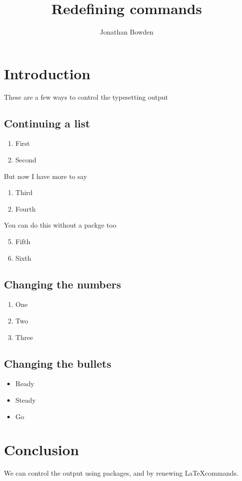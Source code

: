 \documentclass{article}
\title{Redefining commands}
\author{Jonathan Bowden}
\begin{document}
\maketitle

\section{Introduction}

These are a few ways to control the typesetting output

\subsection{Continuing a list}

\begin{enumerate}
\item First
\item Second

\end{enumerate}

\noindent But now I have more to say

\begin{enumerate}[resume]
\item Third
\item Fourth

\end{enumerate}

You can do this without a packge too

\begin{enumerate}
\setcounter{enumi}{4}
\item Fifth
\item Sixth
\end{enumerate}

\subsection{Changing the numbers}

\renewcommand{\theenumi}{\Alph{enumi}}
\begin{enumerate}
\item One
\item Two
\item Three
\end{enumerate}

\subsection{Changing the bullets}
\renewcommand{\labelitemi}{$\rightarrow$}
\begin{itemize}
\item Ready
\item Steady
\item Go

\end{itemize}


\section{Conclusion}

We can control the output using packages, and by renewing \LaTeX commands.
\end{document}
